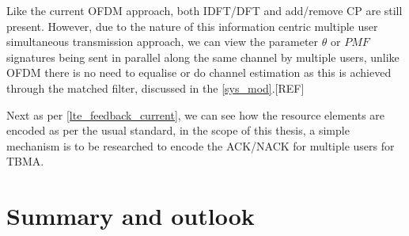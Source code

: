 \documentclass{article}
\begin{document}
Like the current OFDM approach, both IDFT/DFT and add/remove CP are still present. However, due to the nature of this information centric multiple user simultaneous transmission approach, we can view the parameter $\theta$ or $PMF$ signatures being sent in parallel along the same channel by multiple users,  unlike OFDM there is no need to equalise or do channel estimation as this is achieved through the matched filter, discussed in the \cref{sys_mod}.[REF]

Next as per \cref{lte_feedback_current}, we can see how the resource elements are encoded as per the usual standard, in the scope of this thesis, a simple mechanism is to be researched to encode the ACK/NACK for multiple users for TBMA. 




\section{Summary and outlook}\label{summary_out}





\end{document}
